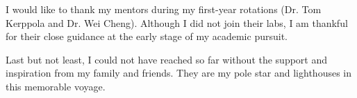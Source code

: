 I would like to thank my mentors during my first-year rotations (Dr. Tom Kerppola and Dr. Wei Cheng). Although I did not join their labs, I am thankful for their close guidance at the early stage of my academic pursuit.%

Last but not least, I could not have reached so far without the support and inspiration from my family and friends. They are my pole star and lighthouses in this memorable voyage.